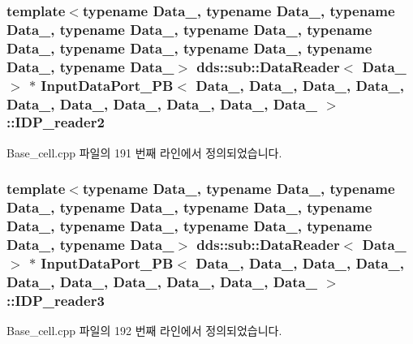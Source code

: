 \subsubsection[{\texorpdfstring{I\+D\+P\+\_\+reader2}{IDP_reader2}}]{\setlength{\rightskip}{0pt plus 5cm}template$<$typename Data\+\_, typename Data\+\_, typename Data\+\_, typename Data\+\_, typename Data\+\_, typename Data\+\_, typename Data\+\_, typename Data\+\_, typename Data\+\_, typename Data\+\_$>$ dds\+::sub\+::\+Data\+Reader$<$ Data\+\_ $>$ $\ast$ {\bf Input\+Data\+Port\+\_\+\+PB}$<$ Data\+\_, Data\+\_, Data\+\_, Data\+\_, Data\+\_, Data\+\_, Data\+\_, Data\+\_, Data\+\_, Data\+\_ $>$\+::I\+D\+P\+\_\+reader2}\hypertarget{classInputDataPort__PB_a63c8784d2ee1568f704a11e4eea03ca6}{}\label{classInputDataPort__PB_a63c8784d2ee1568f704a11e4eea03ca6}


Base\+\_\+cell.\+cpp 파일의 191 번째 라인에서 정의되었습니다.

\subsubsection[{\texorpdfstring{I\+D\+P\+\_\+reader3}{IDP_reader3}}]{\setlength{\rightskip}{0pt plus 5cm}template$<$typename Data\+\_, typename Data\+\_, typename Data\+\_, typename Data\+\_, typename Data\+\_, typename Data\+\_, typename Data\+\_, typename Data\+\_, typename Data\+\_, typename Data\+\_$>$ dds\+::sub\+::\+Data\+Reader$<$ Data\+\_ $>$ $\ast$ {\bf Input\+Data\+Port\+\_\+\+PB}$<$ Data\+\_, Data\+\_, Data\+\_, Data\+\_, Data\+\_, Data\+\_, Data\+\_, Data\+\_, Data\+\_, Data\+\_ $>$\+::I\+D\+P\+\_\+reader3}\hypertarget{classInputDataPort__PB_a59119679d668507d06016fb12640c80c}{}\label{classInputDataPort__PB_a59119679d668507d06016fb12640c80c}


Base\+\_\+cell.\+cpp 파일의 192 번째 라인에서 정의되었습니다.


